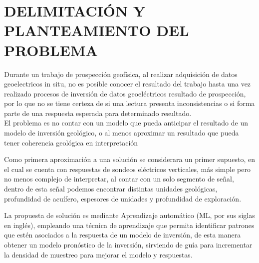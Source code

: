 \chapter{DELIMITACIÓN Y PLANTEAMIENTO DEL PROBLEMA}

Durante un trabajo de prospección geofísica, al realizar adquisición de datos geoelectricos in situ, no es posible conocer el resultado del trabajo hasta una vez realizado procesos de inversión de datos geoeléctricos resultado de prospección, por lo que no se tiene certeza de si una lectura presenta inconsistencias o si forma parte de una respuesta esperada para determinado resultado.\\

El problema es no contar con un modelo que pueda anticipar el resultado de un modelo de inversión geológico, o al menos aproximar un resultado que pueda tener coherencia geológica en interpretación

Como primera aproximación a una solución se considerara un primer supuesto, en el cual se cuenta con respuestas de sondeos eléctricos verticales, más simple pero no menos complejo de interpretar, al contar con un solo segmento de señal, dentro de esta señal podemos encontrar distintas unidades geológicas, profundidad de acuífero, espesores de unidades y profundidad de exploración.

La propuesta de solución es mediante Aprendizaje automático (ML, por sus siglas en inglés), empleando una técnica de aprendizaje que permita identificar patrones que estén asociados a la respuesta de un modelo de inversión, de esta manera obtener un modelo pronóstico de la inversión, sirviendo de guía para incrementar la densidad de muestreo para mejorar el modelo y respuestas.  
